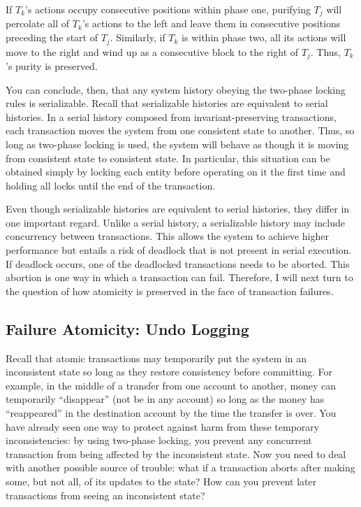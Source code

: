 If $T_k$'s actions occupy consecutive positions within phase one,
purifying $T_j$ will percolate all of $T_k$'s actions to the left and
leave them in consecutive positions preceding the start of $T_j$.
Similarly, if $T_k$ is within phase two, all its actions will
move to the right and wind up as a consecutive block to the right of
$T_j$.  Thus, $T_k$'s purity is preserved.

You can conclude, then, that any system history obeying the two-phase
locking rules is serializable.  Recall that serializable histories are
equivalent to serial histories.  In a serial history composed from
invariant-preserving transactions, each transaction moves the system from one
consistent state to another.   Thus, so long as two-phase locking is
used, the system will behave as though it is moving from consistent
state to consistent state.  In particular, this
situation can be obtained simply by locking each entity before
operating on it the first time and holding all locks until the end of
the transaction.

Even though serializable histories are equivalent to serial histories,
they differ in one important regard.  Unlike a serial history, a
serializable history may include concurrency between transactions.
This allows the system to achieve higher performance but entails a
risk of deadlock that is not present in serial execution.  If deadlock
occurs, one of the deadlocked transactions needs to be aborted.  This
abortion is one way in which a transaction can fail.  Therefore, I
will next turn to the question of how atomicity is preserved in the
face of transaction failures.

\subsection{Failure Atomicity: Undo Logging}\label{failure-atomicity-subsection}
Recall that atomic transactions may temporarily put the system in an
inconsistent state so long as they restore
consistency before committing.  For example, in the middle of a transfer from one
account to another, money can temporarily ``disappear'' (not be in any
account) so long as the money has
``reappeared'' in the destination account by the time the transfer is over.  You have already seen one
way to protect against harm from these temporary inconsistencies: by
using two-phase locking, you prevent any concurrent transaction from
being affected by the inconsistent state.  Now you need to deal with
another possible source of trouble: what if a transaction aborts after
making some, but not all, of its updates to the state?  How can you
prevent later transactions from seeing an inconsistent state?

